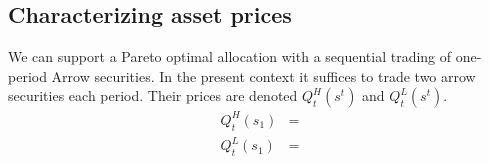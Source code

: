 \documentclass[a4paper,12pt]{article}
\begin{document}
\subsection{Characterizing asset prices}
We can support a Pareto optimal allocation with a sequential trading of one-period Arrow securities. In the present context it suffices to trade two arrow securities each period. Their prices are denoted $Q^H_{t}(s^t)$ and $Q^L_{t}(s^t)$.
\begin{align*}
Q^H_{t}(s_1) &= \\
Q^L_{t}(s_1)  &=
\end{align*}
\newpage 


\end{document}
